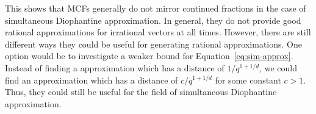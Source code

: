 

This shows that MCFs generally do not mirror continued fractions in the case of simultaneous Diophantine approximation.
In general, they do not provide good rational approximations for irrational vectors at all times.
However, there are still different ways they could be useful for generating rational approximations.
One option would be to investigate a weaker bound for Equation~\ref{eq:sim-approx}.
Instead of finding a approximation which has a distance of $1/q^{1 + 1/d}$,
we could find an approximation which has a distance of $c/q^{1 + 1/d}$ for some constant $c > 1$.
Thus, they could still be useful for the field of simultaneous Diophantine
approximation.
